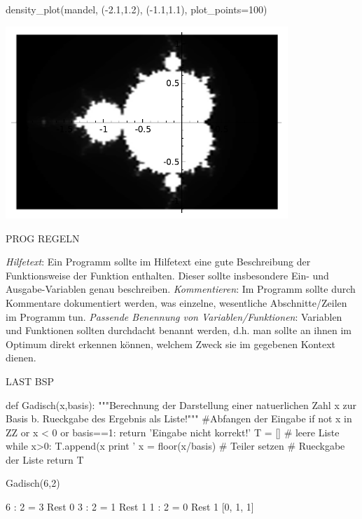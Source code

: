 \documentclass[fontsize=12pt,paper=a4,twoside,bibtotoc,idxtotoc,
liststotoc,pagesize,BCOR1.2cm,DIV15,chapterprefix,pagesize=pdftex]{scrbook}
\theoremstyle{plain}
\theoremstyle{definition}
\theoremstyle{remark}
\begin{document}
\begin{sagein}
density_plot(mandel, (-2.1,1.2), (-1.1,1.1), plot_points=100)
\end{sagein}
\begin{center}
\includegraphics[width=0.8\textwidth]{mandel.pdf} 
\end{center}

PROG REGELN


 \emph{Hilfetext}: Ein Programm sollte im Hilfetext eine gute Beschreibung der Funktionsweise der Funktion enthalten. Dieser sollte insbesondere Ein- und Ausgabe-Variablen genau beschreiben.
 \emph{Kommentieren}: Im Programm sollte durch Kommentare dokumentiert werden, was einzelne, wesentliche Abschnitte/Zeilen im Programm tun.
 \emph{Passende Benennung von Variablen/Funktionen}: Variablen und Funktionen sollten durchdacht benannt werden, d.h. man sollte an ihnen im Optimum direkt erkennen können, welchem Zweck sie im gegebenen Kontext dienen. 


LAST BSP

\begin{sagein}
def Gadisch(x,basis):
    """Berechnung der Darstellung einer natuerlichen Zahl 
x zur Basis b. Rueckgabe des Ergebnis als Liste!"""
    #Abfangen der Eingabe
    if not x in ZZ or x < 0 or basis==1: 
        return 'Eingabe nicht korrekt!'
    T = []  # leere Liste 
    while x>0:
        T.append(x%
        print '%
        x = floor(x/basis) # Teiler setzen
    # Rueckgabe der Liste
    return T
\end{sagein}

\begin{sagein}
Gadisch(6,2)
\end{sagein}
\begin{sage}
6 : 2 = 3 Rest 0
3 : 2 = 1 Rest 1
1 : 2 = 0 Rest 1
[0, 1, 1]
\end{sage}
\end{document}
